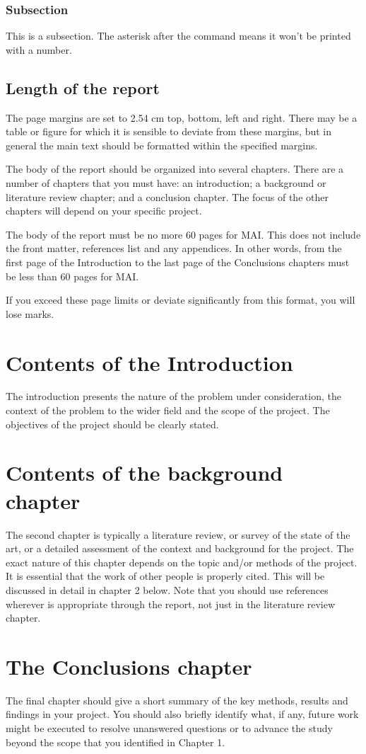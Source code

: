 \subsubsection*{Subsection} This is a subsection. The asterisk after the command means it won't be printed with a number.

\subsection{Length of the report}
The page margins are set to 2.54 cm top, bottom, left and right. There may be a table or figure for which it is sensible to deviate from these margins, but in general the
main text should be formatted within the specified margins.

The body of the report should be organized into several chapters. There are a number of chapters that you must have: an introduction; a background or literature review
chapter; and a conclusion chapter. The focus of the other chapters will depend on your specific project.

The body of the report must be no more 60 pages for MAI. This does not include the front matter, references list and any appendices. In other words, from the first page
of the Introduction to the last page of the Conclusions chapters must be less than 60 pages for MAI.

If you exceed these page limits or deviate significantly from this format, you will lose marks.

\section{Contents of the Introduction}
The introduction presents the nature of the problem under consideration, the context of the problem to the wider field and the scope of the project. The objectives of the
project should be clearly stated.

\section{Contents of the background chapter}
The second chapter is typically a literature review, or survey of the state of the art, or a detailed assessment of the context and background for the project. The exact
nature of this chapter depends on the topic and/or methods of the project. It is essential that the work of other people is properly cited. This will be discussed in
detail in chapter 2 below. Note that you should use references wherever is appropriate through the report, not just in the literature review chapter.

\section{The Conclusions chapter}
The final chapter should give a short summary of the key methods, results and findings in your project. You should also briefly identify what, if any, future work might
be executed to resolve unanswered questions or to advance the study beyond the scope that you identified in Chapter 1.
